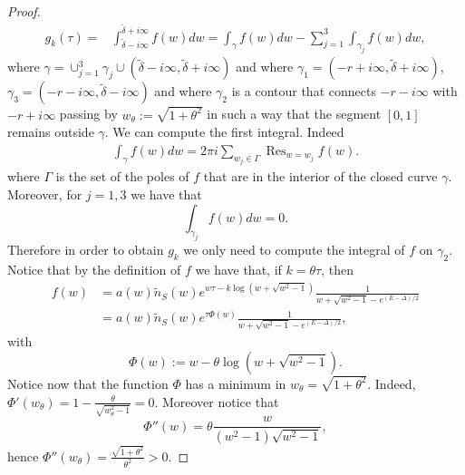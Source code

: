 \documentclass{article}
\numberwithin{equation}{section}
\theoremstyle{plain}
\begin{document}
\begin{proof}
\begin{align*}
g_k (\tau)=& \int_{\tilde{\delta} - i \infty }^{\tilde{\delta}  + i \infty } f(w)  dw =  \int_{\gamma} f(w)  dw  -  \sum_{j=1}^3 \int_{\gamma_j} f(w)   dw, 
\end{align*} 
where $\gamma = \cup_{j=1}^3 \gamma_j \cup ( \tilde{\delta} - i \infty , \tilde{\delta} + i \infty) $ and where 
$\gamma_1=(- r + i \infty , \tilde{\delta} + i \infty ) $, $\gamma_3 = (- r - i \infty , \tilde{\delta} - i \infty )$ and where $\gamma_2 $ is a contour that connects $- r -i\infty  $ with $-r + i \infty  $ passing by $ w_\theta := \sqrt{ 1+\theta^2 }$ in such a way that the segment $[0,1] $ remains outside $\gamma $. 
We can  compute the first integral. Indeed
\begin{align*}
 \int_{\gamma}f(w) dw=  2 \pi i \sum_{w_j \in \Gamma } \operatorname{Res}_{ w= w_j  } f(w).
\end{align*} 
where $\Gamma $ is the set of the poles of $f$ that are in the interior of the closed curve $\gamma$. 
Moreover, for $j=1,3 $ we have that 
\[   \int_{\gamma_j} f(w)  dw=0. 
\]
Therefore in order to obtain $g_k$ we only need to compute the integral of $f $ on $\gamma_2$. 
Notice that by the definition of $f$ we have that, if $k =\theta \tau $, then
\begin{align} \label{f}
f(w) &= a(w) \tilde{n}_S(w)  e^{ w \tau - k \log(w + \sqrt{w^2-1}) }\frac{1}{ w+ \sqrt{w^2-1}- e^{(E-\Delta)/2}} \nonumber \\
&=  a(w) \tilde{n}_S(w)  e^{\tau \Phi (w)  } \frac{1}{  w+ \sqrt{w^2-1}- e^{(E-\Delta)/2}} , 
\end{align} 
with \begin{equation} \label{Phi}
\Phi(w):= w - \theta  \log(w + \sqrt{w^2-1}). 
\end{equation}
Notice now that the function $\Phi $ has a minimum in $w_\theta = \sqrt{1+\theta^2}$. Indeed, $\Phi'(w_\theta )= 1- \frac{\theta }{ \sqrt{w_\theta^2-1 }} =0$. 
Moreover notice that 
\[
\Phi''(w )= \theta \frac{ w}{ (w^2-1) \sqrt{w^2-1 }}, 
\]
hence $ \Phi''(w_\theta)= \frac{\sqrt{1+\theta^2} }{ \theta^2 } > 0$. 


\end{proof}
\end{document}
